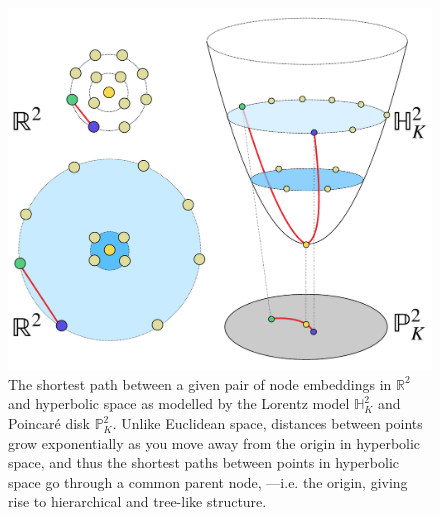\begin{figure}
    \centering
    \vspace{-10pt}
    \includegraphics[width=0.9\linewidth]{explanatory_fig.pdf}
    \vspace{-10pt}
    \caption{The shortest path between a given pair of node embeddings in $\mathbb{R}^2$ and hyperbolic space as modelled by the Lorentz model $\mathbb{H}^2_K$ and Poincar\'e disk $\mathbb{P}^2_K$. Unlike Euclidean space, distances between points grow exponentially as you move away from the origin in hyperbolic space, and thus the shortest paths between points in hyperbolic space go through a common parent node, ---i.e. the origin, giving rise to hierarchical and tree-like structure. }
    \vspace{-10pt}
    \label{fig:explanatory_fig_1}
\end{figure}


